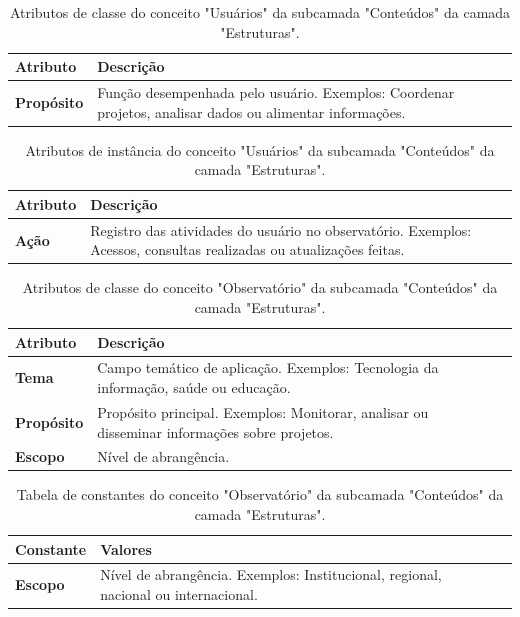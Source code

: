 \begin{apendicesenv}
\begin{table}[H]
\centering
\caption{Atributos de classe do conceito "Usuários" da subcamada "Conteúdos" da camada "Estruturas".}
\begin{tabularx}{\textwidth}{|l|X|X|}
\hline
\textbf{Atributo} & \textbf{Descrição} \\ \hline
\textbf{Propósito} & Função desempenhada pelo usuário. Exemplos: Coordenar projetos, analisar dados ou alimentar informações. \\ \hline
\end{tabularx}
\end{table}

\begin{table}[H]
\centering
\caption{Atributos de instância do conceito "Usuários" da subcamada "Conteúdos" da camada "Estruturas".}
\begin{tabularx}{\textwidth}{|l|X|X|}
\hline
\textbf{Atributo} & \textbf{Descrição} \\ \hline
\textbf{Ação} & Registro das atividades do usuário no observatório. Exemplos: Acessos, consultas realizadas ou atualizações feitas. \\ \hline
\end{tabularx}
\end{table}

\begin{table}[H]
\centering
\caption{Atributos de classe do conceito "Observatório" da subcamada "Conteúdos" da camada "Estruturas".}
\begin{tabularx}{\textwidth}{|l|X|X|}
\hline
\textbf{Atributo} & \textbf{Descrição} \\ \hline
\textbf{Tema} & Campo temático de aplicação. Exemplos: Tecnologia da informação, saúde ou educação. \\ \hline
\textbf{Propósito} & Propósito principal. Exemplos: Monitorar, analisar ou disseminar informações sobre projetos. \\ \hline
\textbf{Escopo} & Nível de abrangência.\\ \hline
\end{tabularx}
\end{table}

\begin{table}[H]
\centering
\caption{Tabela de constantes do conceito "Observatório" da subcamada "Conteúdos" da camada "Estruturas".}
\begin{tabularx}{\textwidth}{|l|X|X|}
\hline
\textbf{Constante} & \textbf{Valores} \\ \hline
\textbf{Escopo} & Nível de abrangência. Exemplos: Institucional, regional, nacional ou internacional. \\ \hline
\end{tabularx}
\end{table}


\end{apendicesenv}
